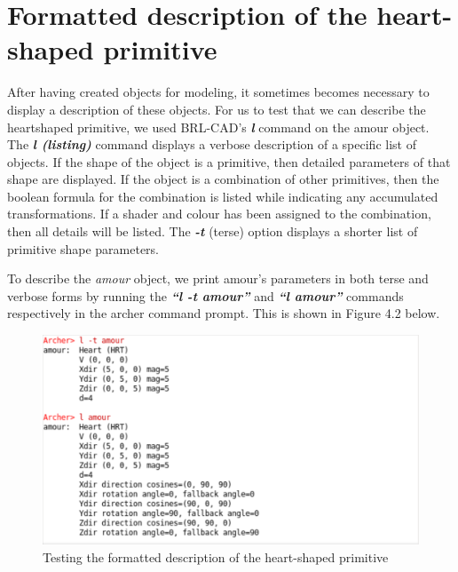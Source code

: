 \section{Formatted description of the heart­-shaped primitive}

After   having   created   objects   for   modeling,   it   sometimes   becomes  
necessary   to   display   a   description   of   these   objects.   For   us   to   test   that   we   can  
describe   the   heart­shaped   primitive,   we   used   BRL-­CAD's   \textit{\textbf{l}} \cite{38}   command   on  
the   amour   object.   The   \textit{\textbf{l (listing)}}   command   displays   a   verbose   description   of   a
 specific   list   of   objects.   If   the   shape   of   the   object   is   a   primitive,   then   detailed  
parameters   of   that   shape   are   displayed.   If   the   object   is   a   combination   of   other  
primitives,   then   the   boolean   formula   for   the   combination   is   listed   while   indicating  
any   accumulated   transformations.   If   a   shader   and   colour   has   been   assigned   to  
the   combination,   then   all   details   will   be   listed.   The   \textit{\textbf{-­t}}   (terse)   option   displays   a  
shorter list of primitive shape parameters.

\hspace{30} To   describe   the   \textit{amour}   object,   we   print   amour's   parameters   in   both   terse  
and   verbose   forms   by   running   the   \textit{\textbf{“l -t amour”}}   and   \textit{\textbf{“l amour”}}   commands  
respectively in the archer command prompt. This is shown in Figure 4.2 below.

\begin{figure}[htbp]
\centering
\includegraphics[trim=0.0cm 0.5cm 0.1cm 0.1cm, clip=true, totalheight=0.4\textheight]{Pictures/Describe.png}
\caption[Testing the formatted description of the heart­-shaped primitive]{Testing the formatted description of the heart­-shaped primitive}
\label{Describe}
\end{figure}

